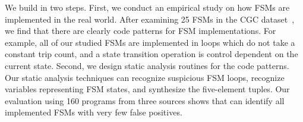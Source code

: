 We build \Tool in two steps. First, we conduct an empirical study 
on how FSMs are implemented in the real world. After examining 25 FSMs in the CGC 
dataset~\cite{CGC}, we find that there are clearly code patterns for FSM implementations. 
For example, all of our studied FSMs are implemented in 
loops which do not take a constant trip count, and a state transition operation 
is control dependent on the current state. 
Second, we design static analysis routines for the code patterns.
Our static analysis techniques can recognize suspicious FSM loops,
recognize variables representing FSM states, and synthesize the five-element tuples. 
Our evaluation using 160 programs from three sources shows that
\Tool{} can identify all implemented FSMs with very few false positives. 






